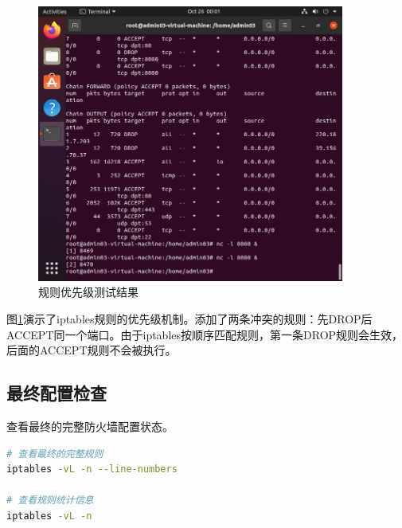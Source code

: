 \documentclass[12pt,a4paper]{article}
\begin{document}
\begin{figure}[H]
    \centering
    \includegraphics[width=0.9\textwidth]{11_rule_priority.png}
    \caption{规则优先级测试结果}
    \label{fig:rule_priority}
\end{figure}

图\ref{fig:rule_priority}演示了iptables规则的优先级机制。添加了两条冲突的规则：先DROP后ACCEPT同一个端口。由于iptables按顺序匹配规则，第一条DROP规则会生效，后面的ACCEPT规则不会被执行。

\subsection{最终配置检查}

查看最终的完整防火墙配置状态。

\begin{lstlisting}[language=bash, caption=最终配置检查]
# 查看最终的完整规则
iptables -vL -n --line-numbers

# 查看规则统计信息
iptables -vL -n
\end{lstlisting}
\end{document}
